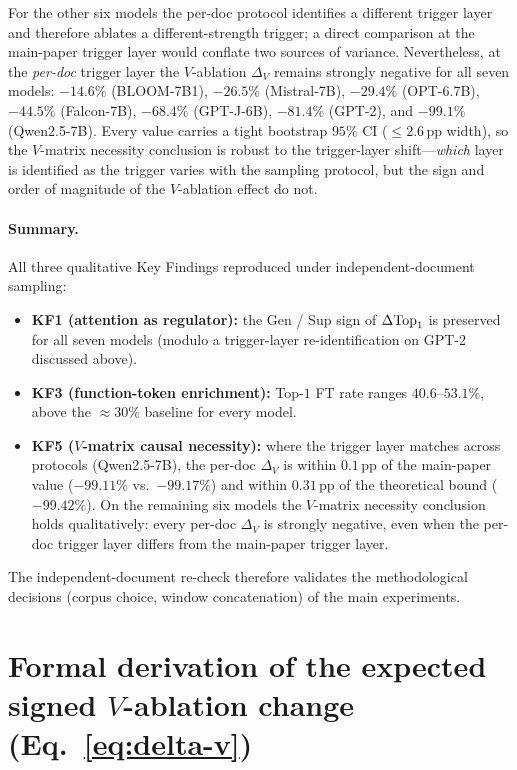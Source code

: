 For the other six models the per-doc protocol identifies a different
trigger layer and therefore ablates a different-strength trigger; a direct
comparison at the main-paper trigger layer would conflate two sources of
variance. Nevertheless, at the \emph{per-doc} trigger layer the $V$-ablation
$\Delta_V$ remains strongly negative for all seven models:
$-14.6\%$ (BLOOM-7B1), $-26.5\%$ (Mistral-7B), $-29.4\%$ (OPT-6.7B),
$-44.5\%$ (Falcon-7B), $-68.4\%$ (GPT-J-6B), $-81.4\%$ (GPT-2), and
$-99.1\%$ (Qwen2.5-7B). Every value carries a tight bootstrap
$95\%$ CI ($\leq 2.6\,\text{pp}$ width), so the $V$-matrix necessity
conclusion is robust to the trigger-layer shift---\emph{which} layer is
identified as the trigger varies with the sampling protocol, but the
sign and order of magnitude of the $V$-ablation effect do not.

\paragraph{Summary.}
All three qualitative Key Findings reproduced under
independent-document sampling:
\begin{itemize}[leftmargin=*,itemsep=1pt,topsep=1pt]
  \item \textbf{KF1 (attention as regulator):} the Gen / Sup sign of
  $\Delta\mathrm{Top}_1$ is preserved for all seven models (modulo a trigger-layer
  re-identification on GPT-2 discussed above).
  \item \textbf{KF3 (function-token enrichment):} Top-$1$ FT rate
  ranges $40.6$--$53.1\%$, above the $\approx\!30\%$ baseline for every
  model.
  \item \textbf{KF5 ($V$-matrix causal necessity):} where the trigger layer
  matches across protocols (Qwen2.5-7B), the per-doc $\Delta_V$ is within
  $0.1\,\text{pp}$ of the main-paper value ($-99.11\%$ vs.\ $-99.17\%$)
  and within $0.31\,\text{pp}$ of the theoretical bound
  ($-99.42\%$). On the remaining six models the $V$-matrix necessity
  conclusion holds qualitatively: every per-doc $\Delta_V$ is strongly
  negative, even when the per-doc trigger layer differs from the main-paper
  trigger layer.
\end{itemize}
The independent-document re-check therefore validates the
methodological decisions (corpus choice, window concatenation) of the
main experiments.

\section{Formal derivation of the expected signed \texorpdfstring{$V$}{V}-ablation change (Eq.~\ref{eq:delta-v})}
\label{app:proofs}

